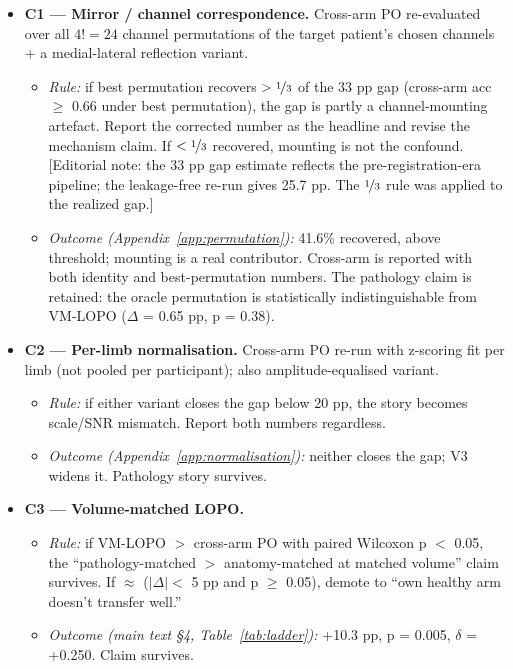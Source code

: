 \documentclass{article}
\begin{document}
\begin{itemize}
  \item \textbf{C1 --- Mirror / channel correspondence.} Cross-arm PO re-evaluated over all $4! = 24$ channel permutations of the target patient's chosen channels + a medial-lateral reflection variant.
  \begin{itemize}
    \item \emph{Rule:} if best permutation recovers $> \nicefrac{1}{3}$ of the 33 pp gap (cross-arm acc $\geq$ 0.66 under best permutation), the gap is partly a channel-mounting artefact. Report the corrected number as the headline and revise the mechanism claim. If $< \nicefrac{1}{3}$ recovered, mounting is not the confound. [Editorial note: the 33 pp gap estimate reflects the pre-registration-era pipeline; the leakage-free re-run gives 25.7 pp. The $\nicefrac{1}{3}$ rule was applied to the realized gap.]
    \item \emph{Outcome (Appendix~\ref{app:permutation}):} 41.6\% recovered, above threshold; mounting is a real contributor. Cross-arm is reported with both identity and best-permutation numbers. The pathology claim is retained: the oracle permutation is statistically indistinguishable from VM-LOPO ($\Delta$ = 0.65 pp, p = 0.38).
  \end{itemize}
  \item \textbf{C2 --- Per-limb normalisation.} Cross-arm PO re-run with z-scoring fit per limb (not pooled per participant); also amplitude-equalised variant.
  \begin{itemize}
    \item \emph{Rule:} if either variant closes the gap below 20 pp, the story becomes scale/SNR mismatch. Report both numbers regardless.
    \item \emph{Outcome (Appendix~\ref{app:normalisation}):} neither closes the gap; V3 widens it. Pathology story survives.
  \end{itemize}
  \item \textbf{C3 --- Volume-matched LOPO.}
  \begin{itemize}
    \item \emph{Rule:} if VM-LOPO $>$ cross-arm PO with paired Wilcoxon p $<$ 0.05, the ``pathology-matched $>$ anatomy-matched at matched volume'' claim survives. If $\approx$ ($|\Delta| <$ 5 pp and p $\geq$ 0.05), demote to ``own healthy arm doesn't transfer well.''
    \item \emph{Outcome (main text \S 4, Table~\ref{tab:ladder}):} +10.3 pp, p = 0.005, $\delta$ = +0.250. Claim survives.

\end{itemize}
\end{itemize}
\end{document}
